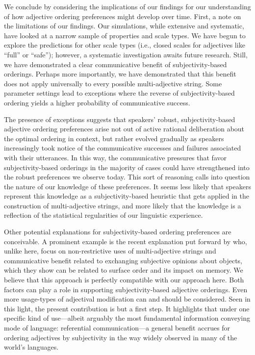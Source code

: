 \documentclass[10pt,a4paper]{article}
\begin{document}
We conclude by considering the implications of our findings for our understanding of how adjective ordering preferences might develop over time. First, a note on the limitations of our findings. Our simulations, while extensive and systematic, have looked at a narrow sample of properties and scale types. We have begun to explore the predictions for other scale types (i.e., closed scales for adjectives like ``full'' or ``safe''); however, a systematic investigation awaits future research. Still, we have demonstrated a clear communicative benefit of subjectivity-based orderings. Perhaps more importantly, we have demonstrated that this benefit does not apply universally to every possible multi-adjective string. Some parameter settings lead to exceptions where the reverse of subjectivity-based ordering yields a higher probability of communicative success.

The presence of exceptions suggests that speakers' robust, subjectivity-based adjective ordering preferences arise not out of active rational deliberation about the optimal ordering in context, but rather evolved gradually as speakers increasingly took notice of the communicative successes and failures associated with their utterances. In this way, the communicative pressures that favor subjectivity-based orderings in the majority of cases could have strengthened into the robust preferences we observe today. This sort of reasoning calls into question the nature of our knowledge of these preferences. It seems less likely that speakers represent this knowledge as a subjectivity-based heuristic that gets applied in the construction of multi-adjective strings, and more likely that the knowledge is a reflection of the statistical regularities of our linguistic experience.

Other potential explanations for subjectivity-based ordering preferences are conceivable. A prominent example is the recent explanation put forward by  who, unlike here, focus on non-restrictive uses of multi-adjective strings and communicative benefit related to exchanging subjective opinions about objects, which they   show can be related to surface order and its impact on memory. We believe that this approach is perfectly compatible with our approach here. Both factors can play a role in supporting subjectivity-based adjective orderings. Even more usage-types of adjectival modification can and should be considered. Seen in this light, the present contribution is but a first step. It highlights that under one specific kind of use---albeit arguably the most fundamental information conveying mode of language: referential communication---a general benefit accrues for ordering adjectives by subjectivity in the way widely observed in many of the world's languages.








\setlength{\bibleftmargin}{.125in}
\setlength{\bibindent}{-\bibleftmargin}


\end{document}
